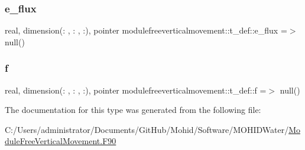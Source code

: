 \mbox{\label{structmodulefreeverticalmovement_1_1t__def_aca56818c05cc4e68136a177a9d9a4e6c}} 
\subsubsection{\texorpdfstring{e\+\_\+flux}{e\_flux}}
{\footnotesize\ttfamily real, dimension(\+: , \+: , \+:), pointer modulefreeverticalmovement\+::t\+\_\+def\+::e\+\_\+flux =$>$ null()\hspace{0.3cm}{\ttfamily [private]}}

\mbox{\label{structmodulefreeverticalmovement_1_1t__def_a1e7bd38a371eab6c682770edd0fc3df5}} 
\subsubsection{\texorpdfstring{f}{f}}
{\footnotesize\ttfamily real, dimension(\+: , \+: , \+:), pointer modulefreeverticalmovement\+::t\+\_\+def\+::f =$>$ null()\hspace{0.3cm}{\ttfamily [private]}}



The documentation for this type was generated from the following file\+:\begin{DoxyCompactItemize}
\item 
C\+:/\+Users/administrator/\+Documents/\+Git\+Hub/\+Mohid/\+Software/\+M\+O\+H\+I\+D\+Water/\mbox{\hyperlink{_module_free_vertical_movement_8_f90}{Module\+Free\+Vertical\+Movement.\+F90}}\end{DoxyCompactItemize}
